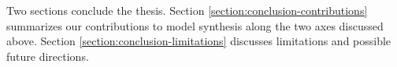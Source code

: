 Two sections conclude the thesis. Section \ref{section:conclusion-contributions} summarizes our contributions to model synthesis along the two axes discussed above. Section \ref{section:conclusion-limitations} discusses limitations and possible future directions. 



